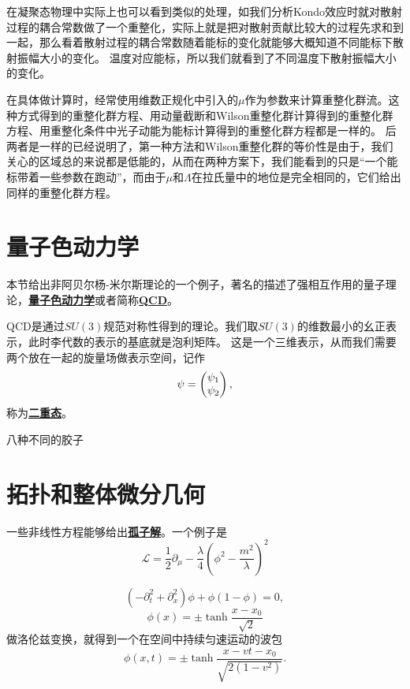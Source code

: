 \documentclass[hyperref, UTF8, a4paper]{ctexart}
\newcommand{\concept}[1]{\underline{\textbf{#1}}}
\begin{document}
在凝聚态物理中实际上也可以看到类似的处理，如我们分析Kondo效应时就对散射过程的耦合常数做了一个重整化，实际上就是把对散射贡献比较大的过程先求和到一起，那么看着散射过程的耦合常数随着能标的变化就能够大概知道不同能标下散射振幅大小的变化。
温度对应能标，所以我们就看到了不同温度下散射振幅大小的变化。

在具体做计算时，经常使用维数正规化中引入的$\mu$作为参数来计算重整化群流。这种方式得到的重整化群方程、用动量截断和Wilson重整化群计算得到的重整化群方程、用重整化条件中光子动能为能标计算得到的重整化群方程都是一样的。
后两者是一样的已经说明了，第一种方法和Wilson重整化群的等价性是由于，我们关心的区域总的来说都是低能的，从而在两种方案下，我们能看到的只是“一个能标带着一些参数在跑动”，而由于$\mu$和$\Lambda$在拉氏量中的地位是完全相同的，它们给出同样的重整化群方程。

\section{量子色动力学}

本节给出非阿贝尔杨-米尔斯理论的一个例子，著名的描述了强相互作用的量子理论，\concept{量子色动力学}或者简称\concept{QCD}。

QCD是通过$SU(3)$规范对称性得到的理论。我们取$SU(3)$的维数最小的幺正表示，此时李代数的表示的基底就是泡利矩阵。
这是一个三维表示，从而我们需要两个放在一起的旋量场做表示空间，记作
\begin{equation}
    \psi = \pmqty{\psi_1 \\ \psi_2},
\end{equation}
称为\concept{二重态}。

八种不同的胶子

\section{拓扑和整体微分几何}

一些非线性方程能够给出\concept{孤子解}。一个例子是
\begin{equation}
    \mathcal{L} = \frac{1}{2} \partial_\mu - \frac{\lambda}{4} \left(\phi^2 - \frac{m^2}{\lambda} \right)^2
\end{equation}

\begin{equation}
    (-\partial_t^2 + \partial_x^2) \phi + \phi ( 1- \phi) = 0,
\end{equation}
\begin{equation}
    \phi(x) = \pm \tanh \frac{x - x_0}{\sqrt{2}}
\end{equation}
做洛伦兹变换，就得到一个在空间中持续匀速运动的波包
\begin{equation}
    \phi(x, t) = \pm \tanh \frac{x - vt - x_0}{\sqrt{2(1-v^2)}}.
\end{equation}
\end{document}
